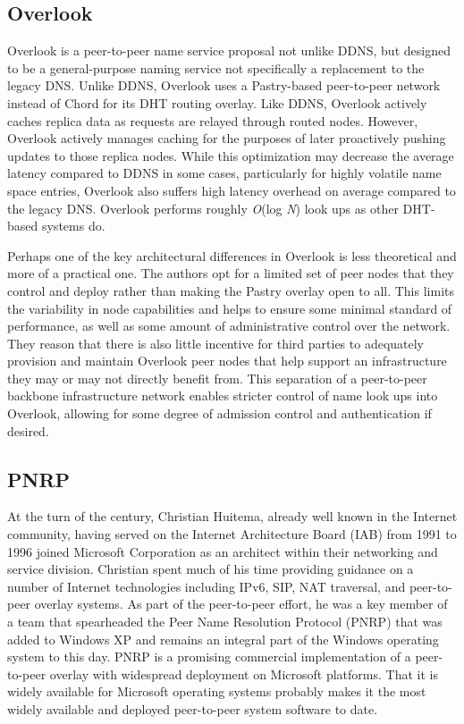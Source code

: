 \documentclass[sigconf]{acmart}
\begin{document}
\subsection{Overlook}

Overlook is a peer-to-peer name service proposal not unlike DDNS, but
designed to be a general-purpose naming service not specifically a
replacement to the legacy DNS.\cite{theimer_overlook:_2002}  Unlike
DDNS, Overlook uses a Pastry-based peer-to-peer network instead of Chord
for its DHT routing overlay.\cite{rowstron_pastry:_2001}  Like DDNS,
Overlook actively caches replica data as requests are relayed through
routed nodes.  However, Overlook actively manages caching for the
purposes of later proactively pushing updates to those replica nodes.
While this optimization may decrease the average latency compared to
DDNS in some cases, particularly for highly volatile name space entries,
Overlook also suffers high latency overhead on average compared to the
legacy DNS.  Overlook performs roughly \emph{O}(log \emph{N}) look ups
as other DHT-based systems do.

Perhaps one of the key architectural differences in Overlook is less
theoretical and more of a practical one.  The authors opt for a limited
set of peer nodes that they control and deploy rather than making the
Pastry overlay open to all.  This limits the variability in node
capabilities and helps to ensure some minimal standard of performance,
as well as some amount of administrative control over the network.  They
reason that there is also little incentive for third parties to
adequately provision and maintain Overlook peer nodes that help support
an infrastructure they may or may not directly benefit from.  This
separation of a peer-to-peer backbone infrastructure network enables
stricter control of name look ups into Overlook, allowing for some degree
of admission control and authentication if desired.

\subsection{PNRP}

At the turn of the century, Christian Huitema, already well known in the
Internet community, having served on the Internet Architecture Board
(IAB) from 1991 to 1996 joined Microsoft Corporation as an architect
within their networking and service division.  Christian spent much of
his time providing guidance on a number of Internet technologies
including IPv6, SIP, NAT traversal, and peer-to-peer overlay systems.
As part of the peer-to-peer effort, he was a key member of a team that
spearheaded the Peer Name Resolution Protocol (PNRP) that was added to
Windows XP and remains an integral part of the Windows operating system
to this day.\cite{huitema_peer--peer_2006}  PNRP is a promising
commercial implementation of a peer-to-peer overlay with widespread
deployment on Microsoft platforms.  That it is widely available for
Microsoft operating systems probably makes it the most widely available
and deployed peer-to-peer system software to date.
\end{document}
